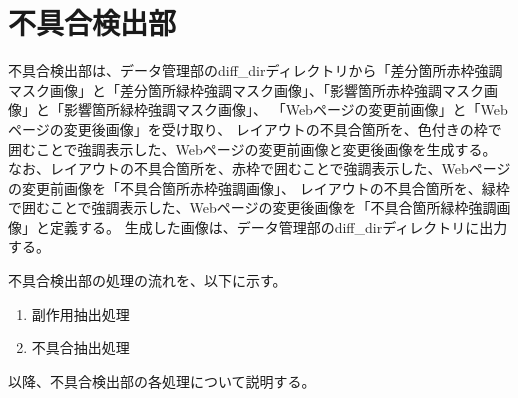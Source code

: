 \section{不具合検出部}\label{sec:Layout_bug_extraction_section}
不具合検出部は、データ管理部のdiff\_dirディレクトリから「差分箇所赤枠強調マスク画像」と「差分箇所緑枠強調マスク画像」、「影響箇所赤枠強調マスク画像」と「影響箇所緑枠強調マスク画像」、
「Webページの変更前画像」と「Webページの変更後画像」を受け取り、
レイアウトの不具合箇所を、色付きの枠で囲むことで強調表示した、Webページの変更前画像と変更後画像を生成する。
なお、レイアウトの不具合箇所を、赤枠で囲むことで強調表示した、Webページの変更前画像を「不具合箇所赤枠強調画像」、
レイアウトの不具合箇所を、緑枠で囲むことで強調表示した、Webページの変更後画像を「不具合箇所緑枠強調画像」と定義する。
生成した画像は、データ管理部のdiff\_dirディレクトリに出力する。
\par
不具合検出部の処理の流れを、以下に示す。
\begin{enumerate}
    \item 副作用抽出処理
    \item 不具合抽出処理
\end{enumerate}
以降、不具合検出部の各処理について説明する。

